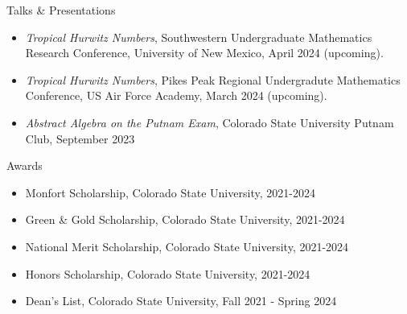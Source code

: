 \documentclass[
	11pt, %
]{resume} %
\begin{document}

\begin{rSection}{Talks \& Presentations}

	\begin{itemize}
		\item{\textit{Tropical Hurwitz Numbers}, Southwestern Undergraduate Mathematics Research Conference, University of New Mexico, April 2024 (upcoming).}
		\item{\textit{Tropical Hurwitz Numbers}, Pikes Peak Regional Undergradute Mathematics Conference, US Air Force Academy, March 2024 (upcoming).}
		\item{\textit{Abstract Algebra on the Putnam Exam}, Colorado State University Putnam Club, September 2023}
	\end{itemize}
	
\end{rSection}


\begin{rSection}{Awards} %


	\begin{itemize}
		\item{Monfort Scholarship, Colorado State University, 2021-2024}
		\item{Green \& Gold Scholarship, Colorado State University, 2021-2024}
		\item{National Merit Scholarship, Colorado State University, 2021-2024}
		\item{Honors Scholarship, Colorado State University, 2021-2024}
		\item{Dean's List, Colorado State University, Fall 2021 - Spring 2024}
	\end{itemize}
	
\end{rSection}
\end{document}
